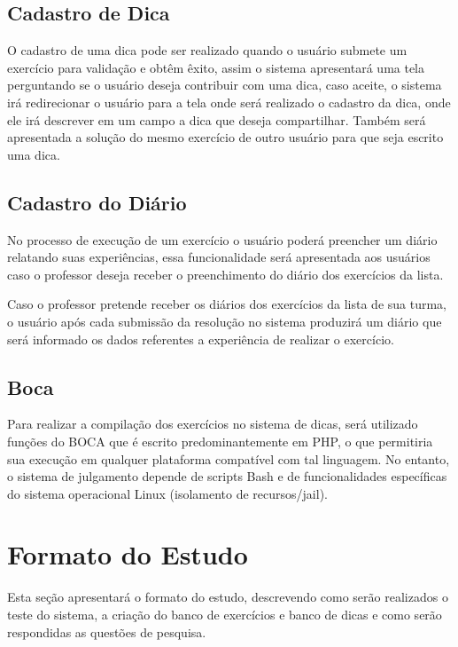 \subsection{Cadastro de Dica}

O cadastro de uma dica pode ser realizado quando o usuário submete um exercício para validação e obtêm êxito, assim o sistema apresentará uma tela perguntando se o usuário deseja contribuir com uma dica, caso aceite, o sistema irá redirecionar o usuário para a tela onde será realizado o cadastro da dica, onde ele irá descrever em um campo a dica que deseja compartilhar. Também será apresentada a solução do mesmo exercício de outro usuário para que seja escrito uma dica. 

\subsection{Cadastro do Diário}

No processo de execução de um exercício o usuário poderá preencher um diário relatando suas experiências, essa funcionalidade será apresentada aos usuários caso o professor deseja receber o preenchimento do diário dos exercícios da lista. 

Caso o professor pretende receber os diários dos exercícios da lista de sua turma, o usuário após cada submissão da resolução no sistema produzirá um diário que será informado os dados referentes a experiência de realizar o exercício. 

\subsection{Boca}

Para realizar a compilação dos exercícios no sistema de dicas, será utilizado funções do  BOCA que é escrito predominantemente em PHP, o que permitiria sua execução em qualquer plataforma compatível com tal linguagem. No entanto, o sistema de julgamento depende de scripts Bash e de funcionalidades específicas do sistema operacional Linux (isolamento de recursos/jail). 

\section{Formato do Estudo}

Esta seção apresentará o formato do estudo, descrevendo como serão realizados o teste do sistema, a criação do banco de exercícios e banco de dicas e como serão respondidas as questões de pesquisa.


